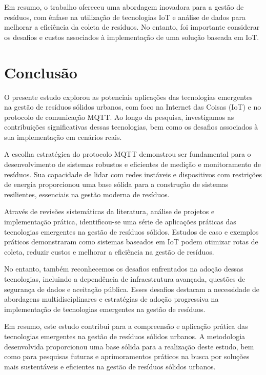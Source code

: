 \documentclass[12pt]{article}
\begin{document}
Em resumo, o trabalho ofereceu uma abordagem inovadora para a gestão de resíduos, com ênfase na utilização de tecnologias IoT e análise de dados para melhorar a eficiência da coleta de resíduos. No entanto, foi importante considerar os desafios e custos associados à implementação de uma solução baseada em IoT.

\section{Conclusão}

O presente estudo explorou as potenciais aplicações das tecnologias emergentes na gestão de resíduos sólidos urbanos, com foco na Internet das Coisas (IoT) e no protocolo de comunicação MQTT. Ao longo da pesquisa, investigamos as contribuições significativas dessas tecnologias, bem como os desafios associados à sua implementação em cenários reais.

A escolha estratégica do protocolo MQTT demonstrou ser fundamental para o desenvolvimento de sistemas robustos e eficientes de medição e monitoramento de resíduos. Sua capacidade de lidar com redes instáveis e dispositivos com restrições de energia proporcionou uma base sólida para a construção de sistemas resilientes, essenciais na gestão moderna de resíduos.

Através de revisões sistemáticas da literatura, análise de projetos e implementação prática, identificou-se uma série de aplicações práticas das tecnologias emergentes na gestão de resíduos sólidos. Estudos de caso e exemplos práticos demonstraram como sistemas baseados em IoT podem otimizar rotas de coleta, reduzir custos e melhorar a eficiência na gestão de resíduos.

No entanto, também reconhecemos os desafios enfrentados na adoção dessas tecnologias, incluindo a dependência de infraestrutura avançada, questões de segurança de dados e aceitação pública. Esses desafios destacam a necessidade de abordagens multidisciplinares e estratégias de adoção progressiva na implementação de tecnologias emergentes na gestão de resíduos.

Em resumo, este estudo contribui para a compreensão e aplicação prática das tecnologias emergentes na gestão de resíduos sólidos urbanos. A metodologia desenvolvida proporcionou uma base sólida para a realização deste estudo, bem como para pesquisas futuras e aprimoramentos práticos na busca por soluções mais sustentáveis e eficientes na gestão de resíduos sólidos urbanos.



\end{document}

